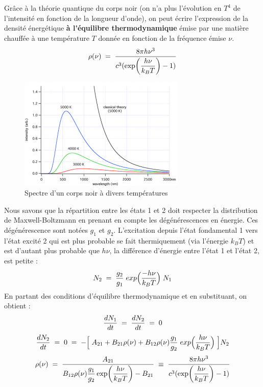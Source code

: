 Grâce à la théorie quantique du corps noir (on n'a plus l'évolution en $T^4$ de l'intensité en fonction de la longueur d'onde), on peut écrire l'expression de la densité énergétique \textbf{à l'équilibre thermodynamique} émise par une matière chauffée à une température $T$ donnée en fonction de la fréquence émise $\nu$.
\begin{equation}
    \rho(\nu) \; = \; \dfrac{8\pi h \nu^3}{c^3(\exp(\dfrac{h\nu}{k_BT})-1)}
\end{equation}
\begin{figure}[tph]
    \centering
    \includegraphics[scale=1.1]{Images2/corps_noir.png}
    \caption{Spectre d'un corps noir à divers températures}
    \label{fig : Corps noir}
\end{figure}
Nous savons que la répartition entre les états 1 et 2 doit respecter la distribution de Maxwell-Boltzmann en prenant en compte les dégénérescences en énergie. Ces dégénérescence sont notées $g_1$ et $g_2$. L'excitation depuis l'état fondamental 1 vers l'état excité 2 qui est plus probable se fait thermiquement (via l'énergie $k_BT$) et est d'autant plus probable que $h\nu$, la différence d'énergie entre l'état 1 et l'état 2, est petite :
\begin{equation*}
    N_2 \; = \; \dfrac{g_2}{g_1} \; exp\Big(\dfrac{-h\nu}{k_BT}\Big) \;N_1
\end{equation*}
En partant des conditions d'équilibre thermodynamique et en substituant, on obtient :
\begin{equation*}
    \dfrac{dN_1}{dt} \; = \; \dfrac{dN_2}{dt} \; = \; 0
\end{equation*}
\begin{equation*}
    \dfrac{dN_2}{dt} 
    \; = \; 0 
    \; = \; - \Big[\;A_{21} + B_{21} \rho(\nu) + B_{12}\rho(\nu) \dfrac{g_1}{g_2} \; exp\Big(\dfrac{h\nu}{k_BT}\Big) \;\Big] N_2
\end{equation*}
\begin{equation*}
    \rho(\nu) 
    \; = \; \dfrac{A_{21}}{B_{12}\rho(\nu) \dfrac{g_1}{g_2} \exp(\dfrac{h\nu}{k_BT}) - B_{21}}
    \;\equiv\; \dfrac{8\pi h \nu^3}{c^3(\exp(\dfrac{h\nu}{k_BT})-1)}
\end{equation*}
